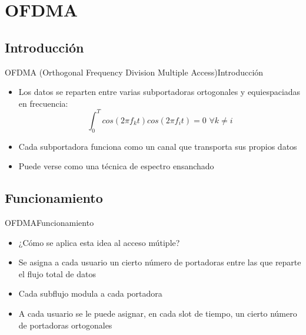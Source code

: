 \documentclass[10pt,compress]{beamer} %
\begin{document}
\section{OFDMA}
\subsection{Introducción}
\begin{frame}{OFDMA (Orthogonal Frequency Division Multiple Access)}{Introducción}
  \begin{itemize}
    \item Los datos se reparten entre varias subportadoras ortogonales y equiespaciadas en frecuencia:
    \begin{displaymath}
      \int_0^T cos \left ( 2\pi f_k t\right ) cos \left ( 2\pi f_i t\right ) = 0 \, \, \forall k \neq i
    \end{displaymath}
    \item Cada subportadora funciona como un canal que transporta sus propios datos
    \item Puede verse como una técnica de espectro ensanchado
  \end{itemize}
\end{frame}

\subsection{Funcionamiento}
\begin{frame}{OFDMA}{Funcionamiento}
  \begin{itemize}
    \item ¿Cómo se aplica esta idea al acceso mútiple?
    \item Se asigna a cada usuario un cierto número de portadoras entre las que reparte el flujo total de datos
    \item Cada subflujo modula a cada portadora
    \item A cada usuario se le puede asignar, en cada slot de tiempo, un cierto número de portadoras ortogonales
  \end{itemize}
\end{frame}
\end{document}
